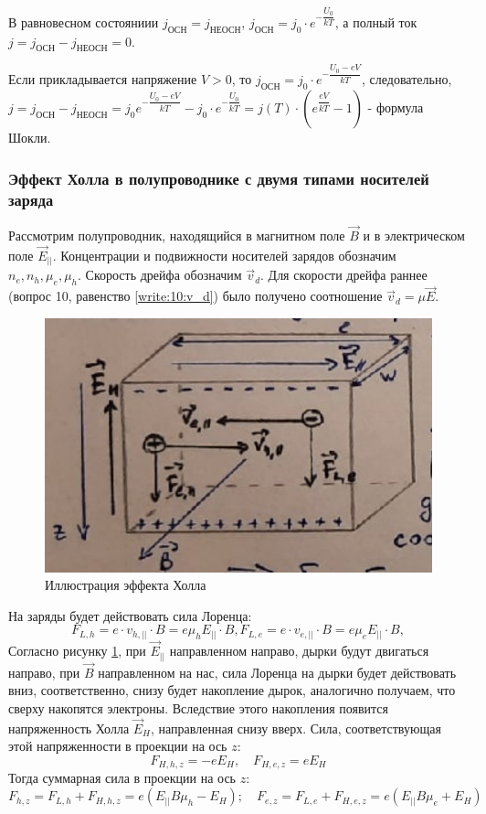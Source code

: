 В равновесном состояниии $j_\text{ОСН} = j_\text{НЕОСН}$, $j_\text{ОСН} = j_0 \cdot e^{-\dfrac{U_0}{kT}}$, а полный ток $j = j_\text{ОСН} - j_\text{НЕОСН} = 0$.

Если прикладывается напряжение $V>0$, то $j_\text{ОСН} = j_0 \cdot e^{-\dfrac{U_0-eV}{kT}}$, следовательно, $j = j_\text{ОСН} - j_\text{НЕОСН} = j_0 e^{-\dfrac{U_0-eV}{kT}} - j_0 \cdot e^{-\dfrac{U_0}{kT}} = j(T) \cdot \left( e^{\dfrac{eV}{kT}} - 1 \right) $ - формула Шокли.

\subsubsection{Эффект Холла в полупроводнике с двумя типами носителей заряда}

Рассмотрим полупроводник, находящийся в магнитном поле $\vec{B}$ и в электрическом поле
$\vec{E}_{||}$.  Концентрации и подвижности носителей зарядов обозначим $n_e, n_h, \mu_e, \mu_h$.
Скорость дрейфа обозначим $\vec{v}_d$. Для скорости дрейфа раннее (вопрос 10, равенство
\eqref{write:10:v_d}) было получено соотношение $\vec{v}_d = \mu \vec{E}$.

\begin{figure}[H]
  \centering
  \includegraphics[width=0.9\linewidth]{img/oral-04/hall-effect.png}
  \caption{Иллюстрация эффекта Холла}
  \label{fig:halleffect}
\end{figure}

На заряды будет действовать сила Лоренца:
\[
  F_{L, h} = e \cdot v_{h, ||} \cdot B = e \mu_h E_{||} \cdot B,
  F_{L, e} = e \cdot v_{e, ||} \cdot B = e \mu_e E_{||} \cdot B,
\]
Согласно рисунку \ref{fig:halleffect}, при $\vec{E}_{||}$ направленном направо, дырки будут 
двигаться направо, при $\vec{B}$ направленном на нас, сила Лоренца на дырки будет действовать вниз,
соответственно, снизу будет накопление дырок, аналогично получаем, что сверху накопятся электроны.
Вследствие этого накопления появится напряженность Холла $\vec{E}_H$, направленная снизу вверх.
Сила, соответствующая этой напряженности в проекции на ось $z$:
\[
  F_{H, h, z} = -e E_{H}, \quad
  F_{H, e, z} = e E_{H}
\]
Тогда суммарная сила в проекции на ось $z$:
\[
  F_{h, z} = F_{L, h} + F_{H, h, z} = e \left( E_{||} B \mu_h - E_H \right); \quad
  F_{e, z} = F_{L, e} + F_{H, e, z} = e \left( E_{||} B \mu_e + E_H \right)
\]

